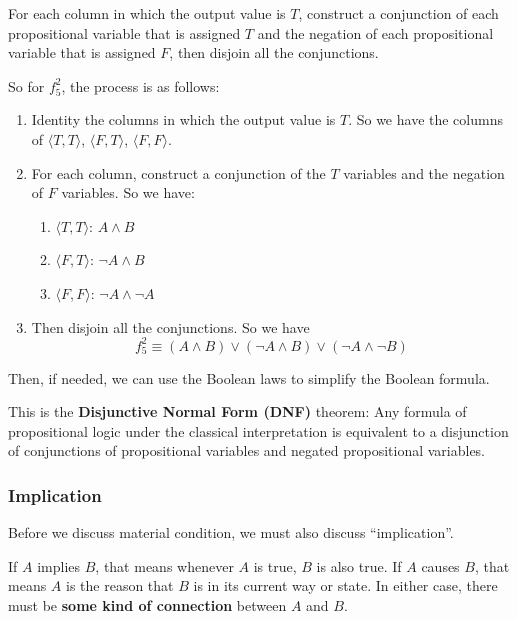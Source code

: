 \documentclass[12pt, letterpaper]{article}
\begin{document}
For each column in which the output value is $T$, construct a conjunction of
each propositional variable that is assigned $T$ and the negation of each
propositional variable that is assigned $F$, then disjoin all the conjunctions.

So for $f_5^2$, the process is as follows:
\begin{enumerate}
  \item Identity the columns in which the output value is $T$. So we have the
        columns of $\langle T, T \rangle$, $\langle F, T \rangle$,
        $\langle F, F \rangle$.
  \item For each column, construct a conjunction of the $T$ variables and the
        negation of $F$ variables. So we have:
        \begin{enumerate}
          \item $\langle T, T \rangle$: $A \land B$
          \item $\langle F, T \rangle$: $\lnot A \land B$
          \item $\langle F, F \rangle$: $\lnot A \land \lnot A$
        \end{enumerate}
  \item Then disjoin all the conjunctions. So we have \[ f_5^2 \equiv (A \land
          B) \lor (\lnot A \land B) \lor (\lnot A \land \lnot B) \]
\end{enumerate}

Then, if needed, we can use the Boolean laws to simplify the Boolean formula.

This is the \textbf{Disjunctive Normal Form (DNF)} theorem: Any formula of
propositional logic under the classical interpretation is equivalent to a
disjunction of conjunctions of propositional variables and negated propositional
variables.

\subsubsection{Implication}

Before we discuss material condition, we must also discuss ``implication''.

If $A$ implies $B$, that means whenever $A$ is true, $B$ is also true. If $A$
causes $B$, that means $A$ is the reason that $B$ is in its current way or
state. In either case, there must be \textbf{some kind of connection} between
$A$ and $B$.
\end{document}
